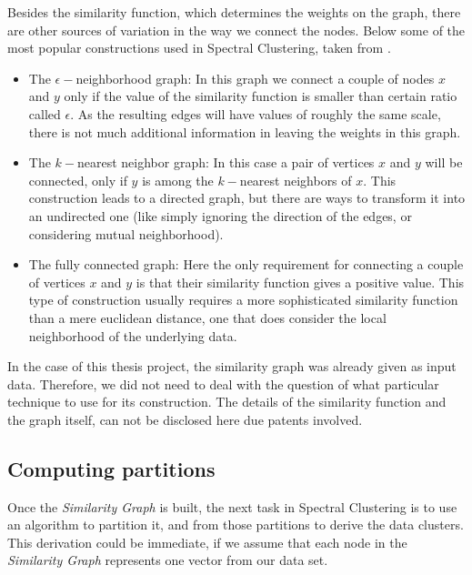 Besides the similarity function, which determines the weights on the
graph, there are other sources of variation in the way we connect the
nodes. Below some of the most popular constructions used in Spectral
Clustering, taken from \cite{luxburg07}. \\

\begin{itemize}
  \item The $\epsilon-$neighborhood graph: In this graph we connect a
    couple of nodes $x$ and $y$ only if the value of the similarity
    function is smaller than certain ratio called $\epsilon$. As the
    resulting edges will have values of roughly the same scale, there
    is not much additional information in leaving the weights in this
    graph. \\
  \item The $k-$nearest neighbor graph: In this case a pair of
    vertices $x$ and $y$ will be connected, only if $y$ is among the
    $k-$nearest neighbors of $x$. This construction leads to a
    directed graph, but there are ways to transform it into an
    undirected one (like simply ignoring the direction of the edges, or
    considering mutual neighborhood). \\
  \item The fully connected graph: Here the only requirement for
    connecting a couple of vertices $x$ and $y$ is that their
    similarity function gives a positive value. This type of
    construction usually requires a more sophisticated similarity
    function than a mere euclidean distance, one that does consider
    the local neighborhood of the underlying data. 
\end{itemize}


In the case of this thesis project, the similarity graph was already
given as input data. Therefore, we did not need to deal with the
question of what particular technique to use for its construction. The
details of the similarity function and the graph itself, can not be
disclosed here due patents involved. \\

\subsection{Computing partitions}
Once the \emph{Similarity Graph} is built, the next task in Spectral
Clustering is to use an algorithm to partition it, and from those
partitions to derive the data clusters. This
derivation could be immediate, if we assume that each node in the
\emph{Similarity Graph} represents one vector from our data set.  \\


